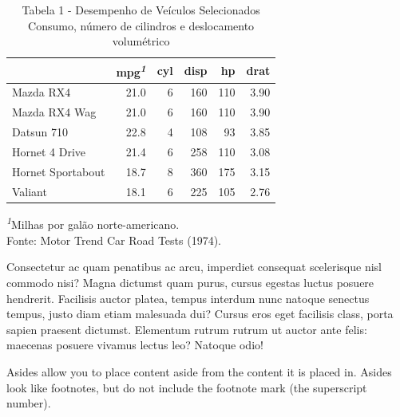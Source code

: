 \documentclass[
  brazilian,
  11pt,
  a4paper,
  open = right,
  twoside = true]{scrbook}
\begin{document}
\begin{table}
\caption*{
{\fontsize{10}{13}\selectfont  Tabela 1 - Desempenho de Veículos Selecionados\fontsize{9}{11}\selectfont } \\ 
{\fontsize{9}{11}\selectfont  Consumo, número de cilindros e deslocamento volumétrico\fontsize{9}{11}\selectfont }
} 
\fontsize{9.0pt}{11.0pt}\selectfont
\begin{tabular*}{\linewidth}{@{\extracolsep{\fill}}l|rrrrr}
\toprule
 & mpg\textsuperscript{\textit{1}} & cyl & disp & hp & drat \\ 
\midrule\addlinespace[2.5pt]
Mazda RX4 & 21.0 & 6 & 160 & 110 & 3.90 \\ 
Mazda RX4 Wag & 21.0 & 6 & 160 & 110 & 3.90 \\ 
Datsun 710 & 22.8 & 4 & 108 & 93 & 3.85 \\ 
Hornet 4 Drive & 21.4 & 6 & 258 & 110 & 3.08 \\ 
Hornet Sportabout & 18.7 & 8 & 360 & 175 & 3.15 \\ 
Valiant & 18.1 & 6 & 225 & 105 & 2.76 \\ 
\bottomrule
\end{tabular*}
\begin{minipage}{\linewidth}
\vspace{.05em}
{\fontsize{9}{11}\selectfont \textcolor[HTML]{0047AB}{\textsuperscript{\textit{1}}Milhas por galão norte-americano.}}\\
{\fontsize{9}{11}\selectfont \textcolor[HTML]{0047AB}{Fonte: Motor Trend Car Road Tests (1974).\\
}}\end{minipage}
\end{table}

Consectetur ac quam penatibus ac arcu, imperdiet consequat scelerisque
nisl commodo nisi? Magna dictumst quam purus, cursus egestas luctus
posuere hendrerit. Facilisis auctor platea, tempus interdum nunc natoque
senectus tempus, justo diam etiam malesuada dui? Cursus eros eget
facilisis class, porta sapien praesent dictumst. Elementum rutrum rutrum
ut auctor ante felis: maecenas posuere vivamus lectus leo? Natoque odio!

Asides allow you to place content aside from the content it is placed
in. Asides look like footnotes, but do not include the footnote mark
(the superscript number).

{}
\end{document}
